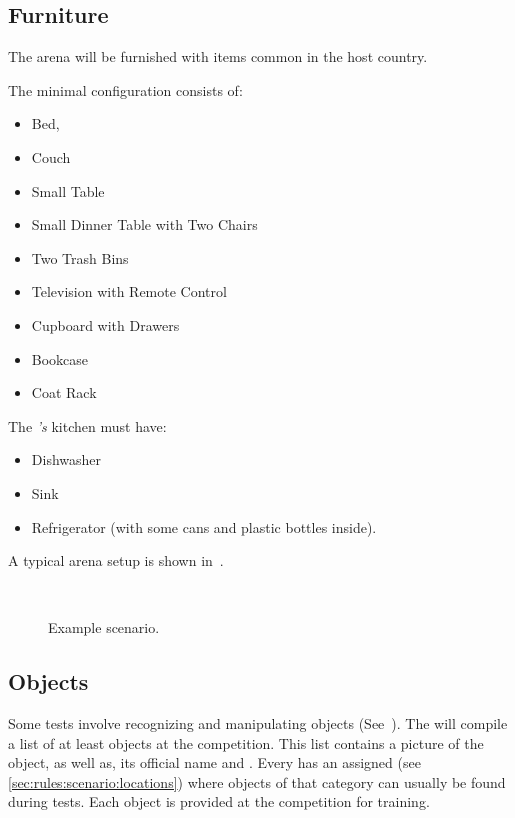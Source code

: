 \subsection{Furniture}
\label{sec:rules:scenario:furniture}
The arena will be furnished with items common in the host country.

The minimal configuration consists of:
\begin{itemize}
	\item Bed,
	\item Couch
	\item Small Table
	\item Small Dinner Table with Two Chairs
	\item Two Trash Bins
	\item Television with Remote Control
	\item Cupboard with Drawers
	\item Bookcase
	\item Coat Rack
\end{itemize}

The \Arena\textit{'s} kitchen must have:
\begin{itemize}
	\item Dishwasher
	\item Sink
	\item Refrigerator (with some cans and plastic bottles inside).
\end{itemize}

A typical arena setup is shown in~.

\begin{figure}[H]
	\centering
	 ~
	\caption{Example \RoboCup\AtHome{} scenario.}
	\label{fig:arena}
\end{figure}

\subsection{Objects}
\label{sec:rules:scenario:objects}
Some tests involve recognizing and manipulating objects (See~).
The \TC{} will compile a list of at least \NumObjects{} objects at the competition. This list contains a picture of the object, as well as, its official name and \ObjectCategory{}. Every \ObjectCategory{} has an assigned \PredefinedLocation{} (see \ref{sec:rules:scenario:locations}) where objects of that category can usually be found during tests.
Each object is provided at the competition for training.

